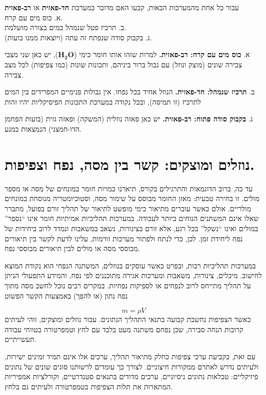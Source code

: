 \documentclass[
  hebrew,
  letterpaper,
  DIV=11,
  numbers=noendperiod]{scrreprt}
\begin{document}
עבור כל אחת מהמערכות הבאות, קבעו האם מדובר במערכת \textbf{חד-פאזית} או
\textbf{רב-פאזית}\\
א. כוס מים עם קרח.\\
ב. תרכיז פטל שנמהל במים בצורה מושלמת.\\
ג. בקבוק סודה שנפתח זה עתה (ויוצאות ממנו בועות).

א. \textbf{כוס מים עם קרח: רב-פאזית.} למרות שזהו אותו חומר כימי
(\(\mathbf{H}_{\mathbf{2}}\mathbf{O}\)), יש כאן שני מצבי צבירה שונים
(מוצק ונוזל) עם גבול ברור ביניהם, ותכונות שונות (כמו צפיפות) לכל מצב
צבירה.

ב. \textbf{תרכיז שנמהל: חד-פאזית.} הנוזל אחיד בכל נפחו. אין גבולות
פנימיים המפרידים בין המים לתרכיז (זו תמיסה), ובכל נקודה במערכת התכונות
הפיסיקליות יהיו זהות

ג. \textbf{בקבוק סודה פתוח: רב-פאזית.} יש כאן פאזה נוזלית (המשקה) ופאזה
גזית (בועות הפחמן הדו-חמצני) הנמצאות במגע.

\section{נוזלים ומוצקים: קשר בין מסה, נפח
וצפיפות.}\label{ux5e0ux5d5ux5d6ux5dcux5d9ux5dd-ux5d5ux5deux5d5ux5e6ux5e7ux5d9ux5dd-ux5e7ux5e9ux5e8-ux5d1ux5d9ux5df-ux5deux5e1ux5d4-ux5e0ux5e4ux5d7-ux5d5ux5e6ux5e4ux5d9ux5e4ux5d5ux5ea.}

עד כה, ברוב הדוגמאות והתרגילים בקורס, תיארנו כמויות חומר במונחים של מסה
או מספר מולים. זו בחירה טבעית: מאזן החומר מבוסס על שימור מסה,
וסטוכיומטריה מנוסחת במונחים מולריים. אולם כאשר עוברים מתיאור כימי מופשט
לתיאור של תהליך זורם בפועל, מתברר שאלו אינם המשתנים הנוחים ביותר לעבודה.
במערכות תהליכיות אמיתיות חומר אינו ``נספר'' במולים ואינו ``נשקל'' בכל
רגע, אלא זורם בצינורות, נשאב במשאבות ונמדד לרוב ביחידות של נפח ליחידת
זמן. לכן, כדי לנתח ולפתור מערכות זורמות, עלינו לדעת לקשר בין תיאורים
מבוססי מסה או מולים לבין תיאורים מבוססי נפח.

במערכות תהליכיות רבות, ובפרט כאשר עוסקים בנוזלים, המשתנה הנפחי הוא נקודת
המוצא לחישוב. מיכלים, צינורות, משאבות ומערכות אגירה מתוכננים לפי נפח,
והמידע התפעולי הניתן על תהליך מתייחס לרוב לנפחים או לספיקות נפחיות.
במקרים רבים נוכל לחשב מסה מתוך נפח נתון (או להפך) באמצעות הקשר הפשוט

\[m = \rho V\] כאשר הצפיפות נחשבת קבועה בתנאי התהליך הנתונים. עבור
נוזלים ומוצקים, זוהי לעיתים קרובות הנחה סבירה, שכן נפחם משתנה מעט בלבד
עם לחץ וטמפרטורה בטווחי עבודה תעשייתיים.

עם זאת, בקביעת ערכי צפיפות כחלק מתיאור תהליך, ערכים אלו אינם תמיד זמינים
ישירות, ולעיתים נדרש לאתרם ממקורות חיצוניים. לצורך כך עומדים לרשותנו
סוגים שונים של נתונים פיזיקליים: טבלאות נתונים ניסיוניים, ערכים מדודים
בתנאים סטנדרטיים, וקורלציות אמפיריות המתארות את תלות הצפיפות בטמפרטורה
ולעיתים גם בלחץ.
\end{document}
